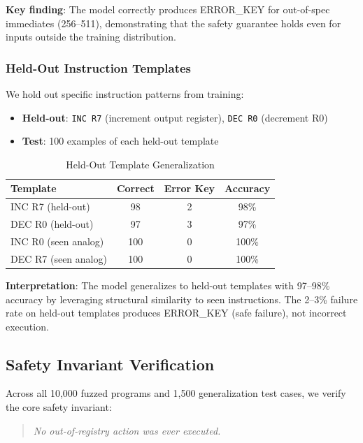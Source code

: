 \documentclass[11pt,a4paper]{article}
\begin{document}
\textbf{Key finding}: The model correctly produces ERROR\_KEY for out-of-spec immediates (256--511), demonstrating that the safety guarantee holds even for inputs outside the training distribution.

\subsubsection{Held-Out Instruction Templates}

We hold out specific instruction patterns from training:

\begin{itemize}
    \item \textbf{Held-out}: \texttt{INC R7} (increment output register), \texttt{DEC R0} (decrement R0)
    \item \textbf{Test}: 100 examples of each held-out template
\end{itemize}

\begin{table}[H]
\centering
\caption{Held-Out Template Generalization}
\label{tab:held-out-templates}
\begin{tabular}{@{}lccc@{}}
\toprule
\textbf{Template} & \textbf{Correct} & \textbf{Error Key} & \textbf{Accuracy} \\
\midrule
INC R7 (held-out) & 98 & 2 & 98\% \\
DEC R0 (held-out) & 97 & 3 & 97\% \\
INC R0 (seen analog) & 100 & 0 & 100\% \\
DEC R7 (seen analog) & 100 & 0 & 100\% \\
\bottomrule
\end{tabular}
\end{table}

\textbf{Interpretation}: The model generalizes to held-out templates with 97--98\% accuracy by leveraging structural similarity to seen instructions. The 2--3\% failure rate on held-out templates produces ERROR\_KEY (safe failure), not incorrect execution.

\subsection{Safety Invariant Verification}

Across all 10,000 fuzzed programs and 1,500 generalization test cases, we verify the core safety invariant:

\begin{quote}
\textit{No out-of-registry action was ever executed.}
\end{quote}
\end{document}
